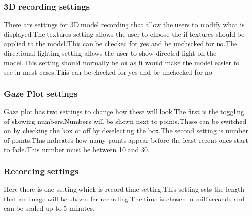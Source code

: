 \subsubsection{3D recording settings}
There are settings for 3D model recording that allow the users to modify what is displayed.The textures setting allows the user to choose the if textures should be applied to the model.This can be checked for yes and be unchecked for no.The directional lighting setting allows the user to show directed light on the model.This setting should normally be on as it would make the model easier to see in most cases.This can be checked for yes and be unchecked for no
\subsubsection{Gaze Plot settings}
Gaze plot has two settings to change how these will look.The first is the toggling of showing numbers.Numbers will be shown next to points.These can be switched on by checking the box or off by deselecting the box.The second setting is number of points.This indicates how many points appear before the least recent ones start to fade.This number must be between 10 and 30.
\subsubsection{Recording settings}
Here there is one setting which is record time setting.This setting sets the length that an image will be shown for recording.The time is chosen in milliseconds and can be scaled up to 5 minutes.
\fi